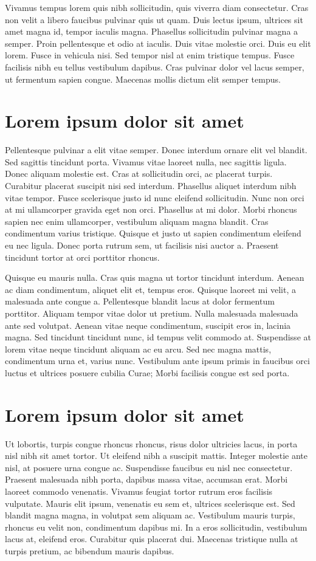 \documentclass{projetofinal-dcc}
\begin{document}
Vivamus tempus lorem quis nibh sollicitudin, quis viverra diam consectetur. Cras non velit a libero faucibus pulvinar quis ut quam. Duis lectus ipsum, ultrices sit amet magna id, tempor iaculis magna. Phasellus sollicitudin pulvinar magna a semper. Proin pellentesque et odio at iaculis. Duis vitae molestie orci. Duis eu elit lorem. Fusce in vehicula nisi. Sed tempor nisl at enim tristique tempus. Fusce facilisis nibh eu tellus vestibulum dapibus. Cras pulvinar dolor vel lacus semper, ut fermentum sapien congue. Maecenas mollis dictum elit semper tempus.

\section{Lorem ipsum dolor sit amet}\label{sec:LABEL_CHP_1_SEC_G}
Pellentesque pulvinar a elit vitae semper. Donec interdum ornare elit vel blandit. Sed sagittis tincidunt porta. Vivamus vitae laoreet nulla, nec sagittis ligula. Donec aliquam molestie est. Cras at sollicitudin orci, ac placerat turpis. Curabitur placerat suscipit nisi sed interdum. Phasellus aliquet interdum nibh vitae tempor. Fusce scelerisque justo id nunc eleifend sollicitudin. Nunc non orci at mi ullamcorper gravida eget non orci. Phasellus at mi dolor. Morbi rhoncus sapien nec enim ullamcorper, vestibulum aliquam magna blandit. Cras condimentum varius tristique. Quisque et justo ut sapien condimentum eleifend eu nec ligula. Donec porta rutrum sem, ut facilisis nisi auctor a. Praesent tincidunt tortor at orci porttitor rhoncus.

Quisque eu mauris nulla. Cras quis magna ut tortor tincidunt interdum. Aenean ac diam condimentum, aliquet elit et, tempus eros. Quisque laoreet mi velit, a malesuada ante congue a. Pellentesque blandit lacus at dolor fermentum porttitor. Aliquam tempor vitae dolor ut pretium. Nulla malesuada malesuada ante sed volutpat. Aenean vitae neque condimentum, suscipit eros in, lacinia magna. Sed tincidunt tincidunt nunc, id tempus velit commodo at. Suspendisse at lorem vitae neque tincidunt aliquam ac eu arcu. Sed nec magna mattis, condimentum urna et, varius nunc. Vestibulum ante ipsum primis in faucibus orci luctus et ultrices posuere cubilia Curae; Morbi facilisis congue est sed porta.

\section{Lorem ipsum dolor sit amet}\label{sec:LABEL_CHP_1_SEC_H}
Ut lobortis, turpis congue rhoncus rhoncus, risus dolor ultricies lacus, in porta nisl nibh sit amet tortor. Ut eleifend nibh a suscipit mattis. Integer molestie ante nisl, at posuere urna congue ac. Suspendisse faucibus eu nisl nec consectetur. Praesent malesuada nibh porta, dapibus massa vitae, accumsan erat. Morbi laoreet commodo venenatis. Vivamus feugiat tortor rutrum eros facilisis vulputate. Mauris elit ipsum, venenatis eu sem et, ultrices scelerisque est. Sed blandit magna magna, in volutpat sem aliquam ac. Vestibulum mauris turpis, rhoncus eu velit non, condimentum dapibus mi. In a eros sollicitudin, vestibulum lacus at, eleifend eros. Curabitur quis placerat dui. Maecenas tristique nulla at turpis pretium, ac bibendum mauris dapibus.
\end{document}
